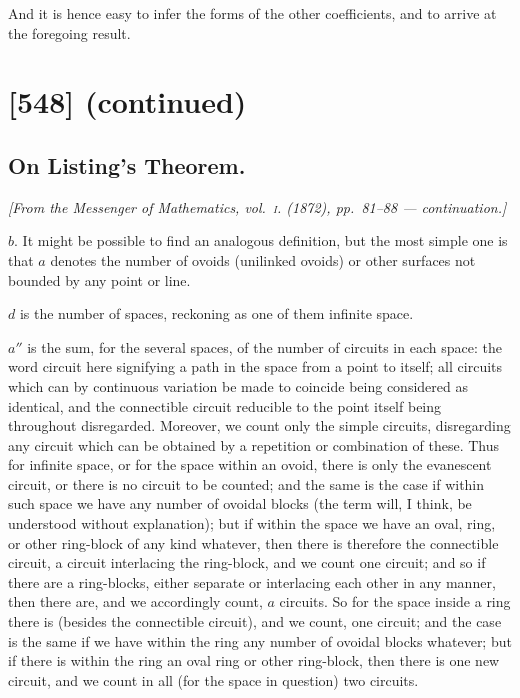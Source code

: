 \documentclass[11pt,a4paper]{book}
\begin{document}
And it is hence easy to infer the forms of the other coefficients, and to arrive at the foregoing result.

\clearpage
\clearpage


\section{[548] (continued)}
\subsection{On Listing's Theorem.}

\begin{center}
\textit{[From the Messenger of Mathematics, vol.~\textsc{i}. (1872), pp.~81--88 --- continuation.]}
\end{center}

\noindent
$b.$ It might be possible to find an analogous definition, but the most simple one
is that $a$ denotes the number of ovoids (unilinked ovoids) or other surfaces not
bounded by any point or line.

$d$ is the number of spaces, reckoning as one of them infinite space.

$a''$ is the sum, for the several spaces, of the number of circuits in each space:
the word circuit here signifying a path in the space from a point to itself; all
circuits which can by continuous variation be made to coincide being considered as
identical, and the connectible circuit reducible to the point itself being throughout
disregarded. Moreover, we count only the simple circuits, disregarding any circuit which
can be obtained by a repetition or combination of these. Thus for infinite space, or
for the space within an ovoid, there is only the evanescent circuit, or there is no
circuit to be counted; and the same is the case if within such space we have any
number of ovoidal blocks (the term will, I think, be understood without explanation);
but if within the space we have an oval, ring, or other ring-block of any kind
whatever, then there is therefore the connectible circuit, a circuit interlacing the ring-block, and we count one circuit; and so if there are a ring-blocks, either separate or
interlacing each other in any manner, then there are, and we accordingly count,
$a$ circuits. So for the space inside a ring there is (besides the connectible circuit),
and we count, one circuit; and the case is the same if we have within the ring any
number of ovoidal blocks whatever; but if there is within the ring an oval ring or
other ring-block, then there is one new circuit, and we count in all (for the space
in question) two circuits.
\end{document}
